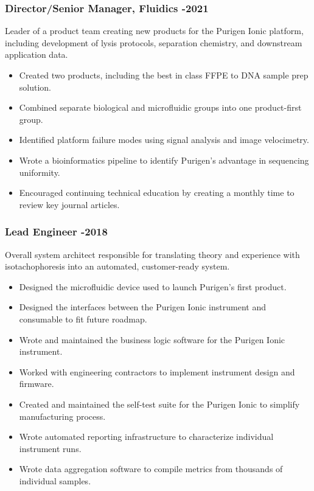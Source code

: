 \documentclass{res}
\begin{document}
\begin{resume}
    \subsubsection{Director/Senior Manager, Fluidics -2021}
      \vspace{-0.2in}
      Leader of a product team creating new products for the Purigen Ionic platform,
      including development of lysis protocols, separation chemistry, and downstream application data.
      \vspace{0.1in}
       \begin{itemize}
        \item Created two products, including the best in class FFPE to DNA sample prep solution.
        \item Combined separate biological and microfluidic groups into one product-first group.
        \item Identified platform failure modes using signal analysis and image velocimetry.
        \item Wrote a bioinformatics pipeline to identify Purigen's advantage in sequencing uniformity.
        \item Encouraged continuing technical education by creating a monthly time to review key journal articles. 
       \end{itemize}


      \vspace{-0.2in}
    \subsubsection{Lead Engineer -2018}
      \vspace{-0.2in}
      Overall system architect responsible for translating theory and experience with isotachophoresis
      into an automated, customer-ready system.
      \vspace{0.1in}
      \begin{itemize}
        \item Designed the microfluidic device used to launch Purigen's first product.
        \item Designed the interfaces between the Purigen Ionic instrument and consumable to fit future roadmap.
        \item Wrote and maintained the business logic software for the Purigen Ionic instrument.
        \item Worked with engineering contractors to implement instrument design and firmware.
        \item Created and maintained the self-test suite for the Purigen Ionic to simplify manufacturing process.
        \item Wrote automated reporting infrastructure to characterize individual instrument runs.
        \item Wrote data aggregation software to compile metrics from thousands of individual samples.
      \end{itemize}


\end{resume}
\end{document}
